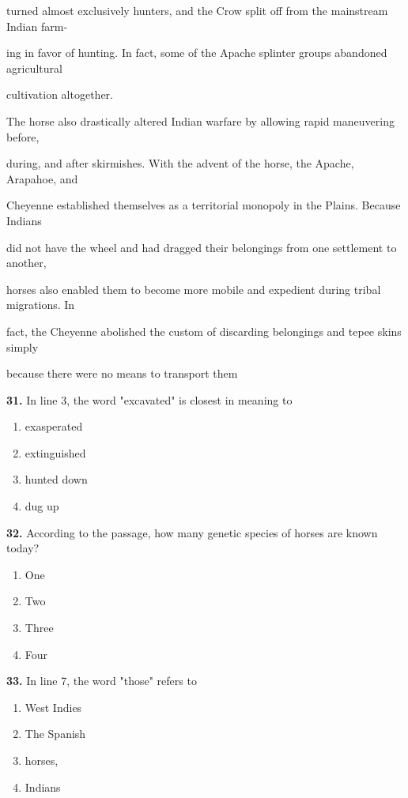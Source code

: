 \documentclass[12pt]{article}
\begin{document}
turned almost exclusively hunters, and the Crow split off from the mainstream Indian farm-\par
ing in favor of hunting. In fact, some of the Apache splinter groups abandoned agricultural\par
cultivation altogether.\par
The horse also drastically altered Indian warfare by allowing rapid maneuvering before,\par
during, and after skirmishes. With the advent of the horse, the Apache, Arapahoe, and\par
Cheyenne established themselves as a territorial monopoly in the Plains. Because Indians\par
did not have the wheel and had dragged their belongings from one settlement to another,\par
horses also enabled them to become more mobile and expedient during tribal migrations. In\par
fact, the Cheyenne abolished the custom of discarding belongings and tepee skins simply\par
because there were no means to transport them\par
\endgroup
\medskip
\noindent\textbf{31.} In line 3, the word "excavated" is closest in meaning to
\begin{enumerate}[label=(\Alph*),leftmargin=*,itemsep=0.2em]
\item exasperated
\item extinguished
\item hunted down
\item dug up
\end{enumerate}
\par
\vspace{0.25\baselineskip}
\noindent\textbf{32.} According to the passage, how many genetic species of horses are known today?
\begin{enumerate}[label=(\Alph*),leftmargin=*,itemsep=0.2em]
\item One
\item Two
\item Three
\item Four
\end{enumerate}
\par
\vspace{0.25\baselineskip}
\noindent\textbf{33.} In line 7, the word "those" refers to
\begin{enumerate}[label=(\Alph*),leftmargin=*,itemsep=0.2em]
\item West Indies
\item The Spanish
\item horses,
\item Indians
\end{enumerate}
\end{document}
